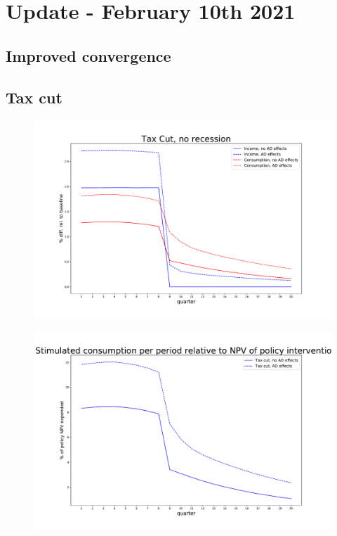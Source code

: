 \documentclass[]{article}
\begin{document}
\section{Update - February 10th 2021}	


\FloatBarrier	
\subsection{Improved convergence}

\FloatBarrier
\subsection{Tax cut}

\begin{figure}
	\centering
	\includegraphics[width=\linewidth]{../full_run/tax_cut}
	\caption{}
	\label{fig:taxcut}
\end{figure}
\begin{figure}
	\centering
	\includegraphics[width=\linewidth]{../full_run/stimulated-consumption_TaxCut}
	\caption{}
	\label{fig:stimulated-consumptiontaxcut}
\end{figure}
\end{document}
